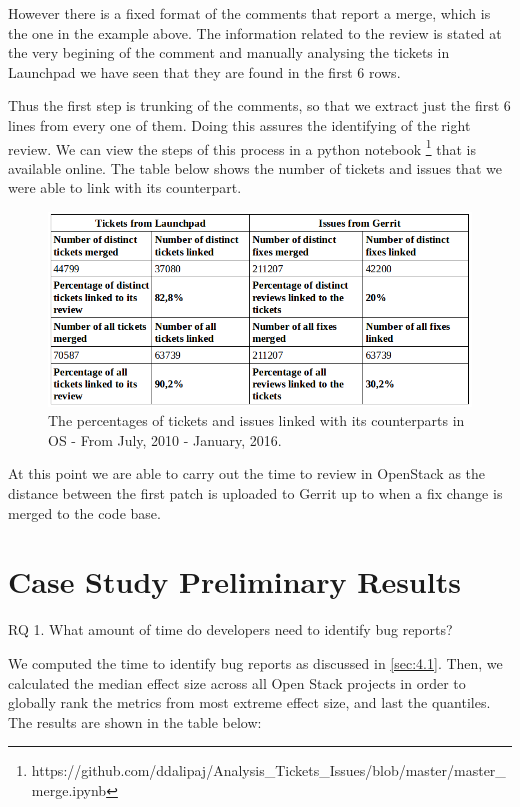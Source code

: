 \documentclass[ifip]{svmult}
\begin{document}
However there is a fixed format of the comments that report a merge, which is the one in the example above.
The information related to the review is stated at the very begining of the 
comment and manually analysing the tickets in Launchpad we have seen that they are found in the first 6 rows.

Thus the first step is trunking of the comments, so that we extract just the first 6 lines from every one of them. 
Doing this assures the identifying of the right review. We can view the steps of this process in a python notebook
\footnote{https://github.com/ddalipaj/Analysis\_Tickets\_Issues/blob/master/master\_merge.ipynb}
that is available online. The table below shows the number of tickets and issues that we were able to link with its 
counterpart.

\begin{figure}[H]
\centering

\includegraphics[width=1.0\textwidth,natwidth=778,natheight=326]{t-i.png}

\caption{The percentages of tickets and issues linked with its counterparts in OS - From July, 2010 - January, 2016.}
\label{fig:2}       %
\end{figure}

At this point we are able to carry out the time to review in OpenStack as the distance between the first patch is 
uploaded to Gerrit up to when a fix change is merged to the code base.

\section{Case Study Preliminary Results}
\label{sec:5}

RQ 1. What amount of time do developers need to identify bug reports?

We computed the time to identify bug reports as discussed in \ref{sec:4.1}. 
Then, we calculated the median effect size across all Open Stack projects in order to globally rank
the metrics from most extreme effect size, and last the quantiles. The results are shown in the table 
below:
\end{document}
